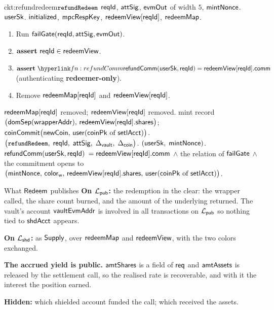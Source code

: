 \begin{CktBox}{ckt:refundredeem}{$\texttt{\small refundRedeem}$}
 $\mathsf{reqId}$, $\mathsf{attSig}$, $\mathsf{evmOut}$ of width $5$, $\mathsf{mintNonce}$.
 $\mathsf{userSk}$.
 $\mathsf{initialized}$, $\mathsf{mpcRespKey}$, $\mathsf{redeemView}[\mathsf{reqId}]$, $\mathsf{redeemMap}$.
\begin{enumerate}[nosep,leftmargin=1.7em,topsep=2pt]
\item Run \hyperref[ckt:failgate]{$\mathsf{failGate}(\mathsf{reqId}, \mathsf{attSig}, \mathsf{evmOut})$}.

\item $\textbf{assert}~ \mathsf{reqId} \in \mathsf{redeemView}$.
\item $\assert \lnk{fn:refundComm}{\refundComm(\usersk, \rid)} = \redeemView[\rid].\fComm$ (authenticating
      \textbf{redeemer-only}).
\item Remove $\mathsf{redeemMap}[\mathsf{reqId}]$ and $\mathsf{redeemView}[\mathsf{reqId}]$.
\end{enumerate}
\begin{OutList}
\oitem{\Dvault} $\mathsf{redeemMap}[\mathsf{reqId}]$ removed; $\mathsf{redeemView}[\mathsf{reqId}]$ removed.
\oitem{\Dshd} \bluedot mint record
  $\bigl(\mathsf{domSep}(\mathsf{wrapperAddr}),\, \mathsf{redeemView}[\mathsf{reqId}].\mathsf{shares}\bigr)$; \;
  \bluedot $\mathsf{coinCommit}\bigl(\mathsf{newCoin},\, \mathsf{user}(\mathsf{coinPk} \text{ of } \mathsf{setlAcct})\bigr)$.
\oitem{\stmt} $\bigl(\texttt{\small refundRedeem},\; \mathsf{reqId},\; \mathsf{attSig},\; \Delta_{\mathsf{vault}},\; \Delta_{\mathsf{coin}}\bigr)$.
\oitem{\wit} $(\mathsf{userSk},\; \mathsf{mintNonce})$.
\oitem{\Rel} $\mathsf{refundComm}(\mathsf{userSk}, \mathsf{reqId})$ $= \mathsf{redeemView}[\mathsf{reqId}].\mathsf{comm}$ \;$\wedge$\; the relation of
  $\mathsf{failGate}$ \;$\wedge$\; the commitment opens to
  $\bigl(\mathsf{mintNonce},\, \mathsf{color}_{\mathsf{w}},\, \mathsf{redeemView}[\mathsf{reqId}].\mathsf{shares},\, \mathsf{user}(\mathsf{coinPk} \text{ of }
  \mathsf{setlAcct})\bigr)$.
\end{OutList}
\end{CktBox}
\begin{PubBox}{What $\mathsf{Redeem}$ publishes}
\textbf{On $\mathcal{L}_{\mathsf{pub}}$:} the redemption in the clear: the wrapper called, the share count burned,  and the amount of the underlying returned. The vault's account $\mathsf{vaultEvmAddr}$ is involved in all transactions on $\mathcal{L}_{\mathsf{pub}}$ so nothing tied to $\mathsf{shdAcct}$ appears.

\smallskip
\textbf{On $\mathcal{L}_{\mathsf{shd}}$:} as $\mathsf{Supply}$, over $\mathsf{redeemMap}$ and $\mathsf{redeemView}$, with the two colors exchanged.

\smallskip
\textbf{The accrued yield is public.} $\mathsf{amtShares}$ is a field of $\mathsf{req}$ and $\mathsf{amtAssets}$ is released
by the settlement call, so the realised rate is recoverable, and with it the interest the position
earned.

\smallskip
\textbf{Hidden:} which shielded account funded the call; which received the assets.
\end{PubBox}
